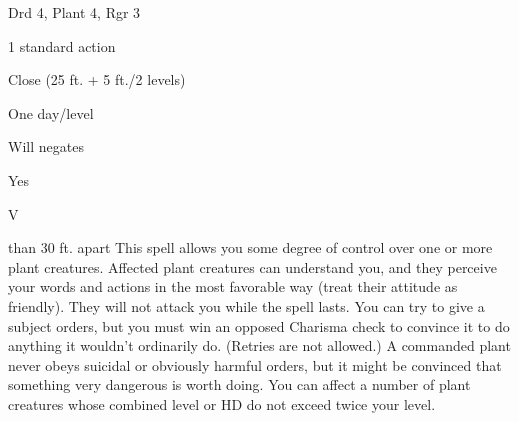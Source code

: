
\begin{description*}
\item[Level:] Drd 4, Plant 4, Rgr 3
\item[Casting Time:] 1 standard action
\item[Range:] Close (25 ft. + 5 ft./2 levels)
\item[Duration:] One day/level
\item[Saving Throw:] Will negates
\item[Spell Resistance:] Yes
\item[Components:] V
\end{description*}

than 30 ft. apart
This spell allows you some degree of control over one or more plant creatures.
Affected plant creatures can understand you, and they perceive your words and actions
in the most favorable way (treat their attitude as friendly). They will not attack
you while the spell lasts. You can try to give a subject orders, but you must win
an opposed Charisma check to convince it to do anything it wouldn't ordinarily
do. (Retries are not allowed.) A commanded plant never obeys suicidal or obviously
harmful orders, but it might be convinced that something very dangerous is worth
doing.
You can affect a number of plant creatures whose combined level or HD do not exceed
twice your level.
